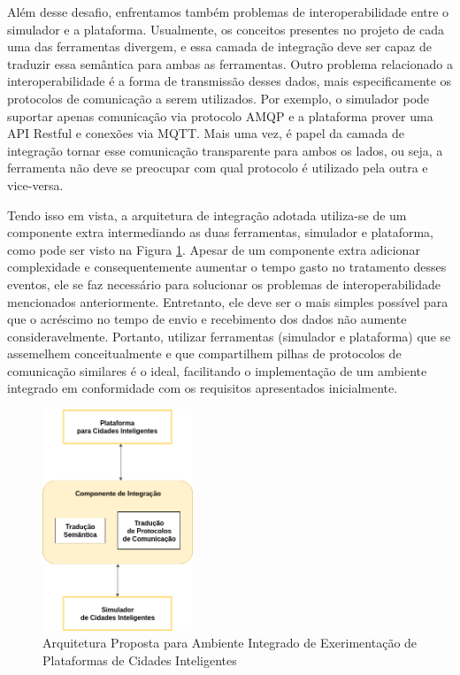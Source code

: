 Além desse desafio, enfrentamos também problemas de interoperabilidade entre o simulador e a plataforma.
Usualmente, os conceitos presentes no projeto de cada uma das ferramentas divergem, e essa camada de integração deve ser capaz de traduzir essa semântica para ambas as ferramentas.
Outro problema relacionado a interoperabilidade é a forma de transmissão desses dados, mais especificamente os protocolos de comunicação a serem utilizados.
Por exemplo, o simulador pode suportar apenas comunicação via protocolo AMQP e a plataforma prover uma API Restful e conexões via MQTT.
Mais uma vez, é papel da camada de integração tornar esse comunicação transparente para ambos os lados, ou seja, a ferramenta não deve se preocupar com qual protocolo é utilizado pela outra e vice-versa.

Tendo isso em vista, a arquitetura de integração adotada utiliza-se de um componente extra intermediando as duas ferramentas, simulador e plataforma, como pode ser visto na
Figura \ref{fig:general_architecture}.
Apesar de um componente extra adicionar complexidade e consequentemente aumentar o tempo gasto no tratamento desses eventos, ele se faz necessário para solucionar os problemas
de interoperabilidade mencionados anteriormente.
Entretanto, ele deve ser o mais simples possível para que o acréscimo no tempo de envio e recebimento dos dados não aumente consideravelmente.
Portanto, utilizar ferramentas (simulador e plataforma) que se assemelhem conceitualmente e que compartilhem pilhas de protocolos de comunicação similares é o ideal,
facilitando o implementação de um ambiente integrado em conformidade com os requisitos apresentados inicialmente.

\begin{figure}[ht]
	\centering
	\includegraphics[width=0.4\textwidth]{figuras/integration-general-architecture.png}
	\caption{Arquitetura Proposta para Ambiente Integrado de Exerimentação de Plataformas de Cidades Inteligentes}
	\label{fig:general_architecture}
\end{figure}


